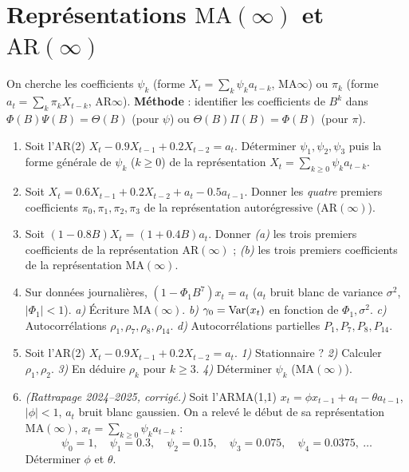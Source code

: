 \documentclass[11pt]{article}
\begin{document}
\section{Représentations \texorpdfstring{$\mathrm{MA}(\infty)$ et $\mathrm{AR}(\infty)$}{MA-inf et AR-inf}}
\begin{contexte}
On cherche les coefficients $\psi_k$ (forme $X_t=\sum_k\psi_k a_{t-k}$, MA$\infty$) ou
$\pi_k$ (forme $a_t=\sum_k\pi_k X_{t-k}$, AR$\infty$). \textbf{Méthode} : identifier les
coefficients de $B^k$ dans $\Phi(B)\Psi(B)=\Theta(B)$ (pour $\psi$) ou
$\Theta(B)\Pi(B)=\Phi(B)$ (pour $\pi$).
\end{contexte}
\begin{enumerate}[label=\textbf{Q\,C.\arabic*},leftmargin=*]
\item Soit l'AR(2) $X_t-0.9X_{t-1}+0.2X_{t-2}=a_t$. Déterminer $\psi_1,\psi_2,\psi_3$ puis la
forme générale de $\psi_k$ ($k\ge0$) de la représentation $X_t=\sum_{k\ge0}\psi_k a_{t-k}$.

\item Soit $X_t=0.6X_{t-1}+0.2X_{t-2}+a_t-0.5a_{t-1}$. Donner les \emph{quatre} premiers
coefficients $\pi_0,\pi_1,\pi_2,\pi_3$ de la représentation autorégressive
($\mathrm{AR}(\infty)$).

\item Soit $(1-0.8B)X_t=(1+0.4B)a_t$. Donner \emph{(a)} les trois premiers coefficients de la
représentation $\mathrm{AR}(\infty)$ ; \emph{(b)} les trois premiers coefficients de la
représentation $\mathrm{MA}(\infty)$.

\item Sur données journalières, $(1-\Phi_1 B^7)x_t=a_t$ ($a_t$ bruit blanc de variance
$\sigma^2$, $|\Phi_1|<1$). \emph{a)} Écriture $\mathrm{MA}(\infty)$. \emph{b)}
$\gamma_0=\operatorname{Var}(x_t)$ en fonction de $\Phi_1,\sigma^2$. \emph{c)} Autocorrélations
$\rho_1,\rho_7,\rho_8,\rho_{14}$. \emph{d)} Autocorrélations partielles
$P_1,P_7,P_8,P_{14}$.

\item Soit l'AR(2) $X_t-0.9X_{t-1}+0.2X_{t-2}=a_t$. \emph{1)} Stationnaire ? \emph{2)}
Calculer $\rho_1,\rho_2$. \emph{3)} En déduire $\rho_k$ pour $k\ge3$. \emph{4)} Déterminer
$\psi_k$ ($\mathrm{MA}(\infty)$).

\item \emph{(Rattrapage 2024--2025, corrigé.)} Soit l'ARMA(1,1)
$x_t=\phi x_{t-1}+a_t-\theta a_{t-1}$, $|\phi|<1$, $a_t$ bruit blanc gaussien. On a relevé le
début de sa représentation $\mathrm{MA}(\infty)$, $x_t=\sum_{k\ge0}\psi_k a_{t-k}$ :
\[
\psi_0=1,\quad \psi_1=0.3,\quad \psi_2=0.15,\quad \psi_3=0.075,\quad \psi_4=0.0375,\ \dots
\]
Déterminer $\phi$ et $\theta$.
\end{enumerate}
\end{document}
